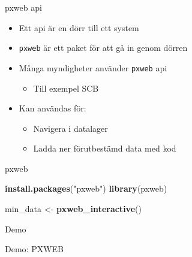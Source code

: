 \documentclass[
  11pt,
  ignorenonframetext,
  handout]{beamer}
\newenvironment{Shaded}{\begin{snugshade}}{\end{snugshade}}
\newcommand{\FunctionTok}[1]{\textcolor[rgb]{0.13,0.29,0.53}{\textbf{#1}}}
\newcommand{\NormalTok}[1]{#1}
\newcommand{\OtherTok}[1]{\textcolor[rgb]{0.56,0.35,0.01}{#1}}
\newcommand{\StringTok}[1]{\textcolor[rgb]{0.31,0.60,0.02}{#1}}
\providecommand{\tightlist}{%
  \setlength{\itemsep}{0pt}\setlength{\parskip}{0pt}}
\begin{document}
\begin{frame}{pxweb api}
\protect{}\label{pxweb-api}
\begin{itemize}
\tightlist
\item
  Ett api är en dörr till ett system
\item
  \texttt{pxweb} är ett paket för att gå in genom dörren
\item
  Många myndigheter använder \texttt{pxweb} api

  \begin{itemize}
  \tightlist
  \item
    Till exempel SCB
  \end{itemize}
\item
  Kan användas för:

  \begin{itemize}
  \tightlist
  \item
    Navigera i datalager
  \item
    Ladda ner förutbestämd data med kod
  \end{itemize}
\end{itemize}
\end{frame}

\begin{frame}[fragile]{pxweb}
\protect{}\label{pxweb}
\begin{Shaded}
\begin{Highlighting}[]
\FunctionTok{install.packages}\NormalTok{(}\StringTok{"pxweb"}\NormalTok{)}
\FunctionTok{library}\NormalTok{(pxweb)}

\NormalTok{min\_data }\OtherTok{\textless{}{-}} \FunctionTok{pxweb\_interactive}\NormalTok{()}
\end{Highlighting}
\end{Shaded}
\end{frame}

\begin{frame}{Demo}
\protect{}\label{demo-3}
\begin{block}{Demo: PXWEB}
\protect{}\label{demo-pxweb}
\end{block}
\end{frame}
\end{document}
